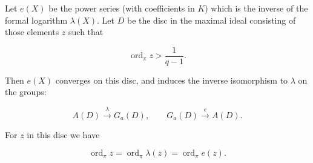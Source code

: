 Let $e(X)$ be the power series (with coefficients in $K$) which is the inverse of the formal logarithm $\lambda(X)$. Let $D$ be the disc in the maximal ideal consisting of those elements $z$ such that

$$\operatorname{ord}_\pi z > \frac{1}{q-1}.$$

Then $e(X)$ converges on this disc, and induces the inverse isomorphism to $\lambda$ on the groups:

$$A(D) \xrightarrow{\lambda} G_a(D), \qquad G_a(D) \xrightarrow{e} A(D).$$

For $z$ in this disc we have

$$\operatorname{ord}_\pi z = \operatorname{ord}_\pi \lambda(z) = \operatorname{ord}_\pi e(z).$$
